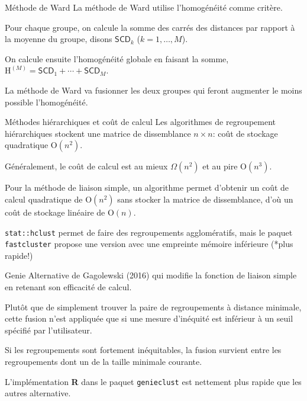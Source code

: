 \documentclass[
  ignorenonframetext,
]{beamer}
\begin{document}
\begin{frame}{Méthode de Ward}
\protect\hypertarget{muxe9thode-de-ward}{}
La méthode de Ward utilise l'homogénéité comme critère.

Pour chaque groupe, on calcule la somme des carrés des distances par
rapport à la moyenne du groupe, disons \(\mathsf{SCD}_k\)
(\(k=1, \ldots, M\)).

On calcule ensuite l'homogénéité globale en faisant la somme,
\(\mathrm{H}^{(M)} = \mathsf{SCD}_1 + \cdots + \mathsf{SCD}_M\).

La méthode de Ward va fusionner les deux groupes qui feront augmenter le
moins possible l'homogénéité.
\end{frame}

\begin{frame}[fragile]{Méthodes hiérarchiques et coût de calcul}
\protect\hypertarget{muxe9thodes-hiuxe9rarchiques-et-couxfbt-de-calcul}{}
Les algorithmes de regroupement hiérarchiques stockent une matrice de
dissemblance \(n \times n\): coût de stockage quadratique
\(\mathrm{O}(n^2)\).

Généralement, le coût de calcul est au mieux \(\Omega(n^2)\) et au pire
\(\mathrm{O}(n^3)\).

Pour la méthode de liaison simple, un algorithme permet d'obtenir un
coût de calcul quadratique de \(\mathrm{O}(n^2)\) sans stocker la
matrice de dissemblance, d'où un coût de stockage linéaire de
\(\mathrm{O}(n)\).

\texttt{stat::hclust} permet de faire des regroupements agglomératifs,
mais le paquet \texttt{fastcluster} propose une version avec une
empreinte mémoire inférieure (*plus rapide!)
\end{frame}

\begin{frame}[fragile]{Genie}
\protect\hypertarget{genie}{}
Alternative de Gagolewski (2016) qui modifie la fonction de liaison
simple en retenant son efficacité de calcul.

Plutôt que de simplement trouver la paire de regroupements à distance
minimale, cette fusion n'est appliquée que si une mesure d'inéquité est
inférieur à un seuil spécifié par l'utilisateur.

Si les regroupements sont fortement inéquitables, la fusion survient
entre les regroupements dont un de la taille minimale courante.

L'implémentation \textbf{R} dans le paquet \texttt{genieclust} est
nettement plus rapide que les autres alternative.
\end{frame}
\end{document}
